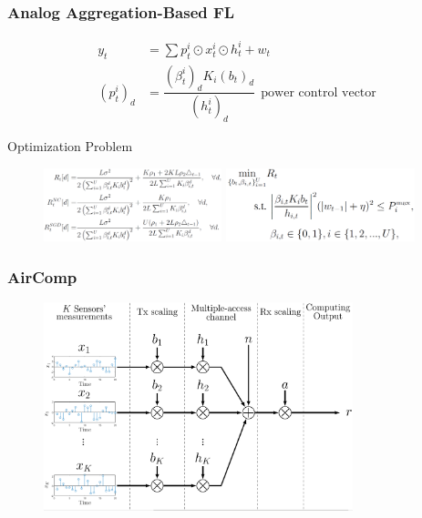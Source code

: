\begin{frame}
\frametitle{Analog Aggregation-Based FL\cite{Fan_2021_AirFL}}

{\smaller
\begin{align*}
y_t & = \sum p_t^i \odot x_t^i \odot h_t^i + w_t \\
(p_t^i)_d & = \dfrac{(\beta_t^i)_d K_i (b_t)_d}{(h_t^i)_d} ~~ \text{power control vector}
\end{align*}
}

\begin{block}{Optimization Problem}
\begin{figure}
\centering
\includegraphics[width=0.46\textwidth]{images/AirFL-objective.png}
\includegraphics[width=0.49\textwidth]{images/AirFL-P3.png}
\end{figure}
\end{block}


\end{frame}


\begin{frame}
\frametitle{AirComp\cite{Liu_2020_AirComp}}

\begin{figure}
\centering
\includegraphics[width=0.8\textwidth]{images/AirComp.png}
\end{figure}


\end{frame}

